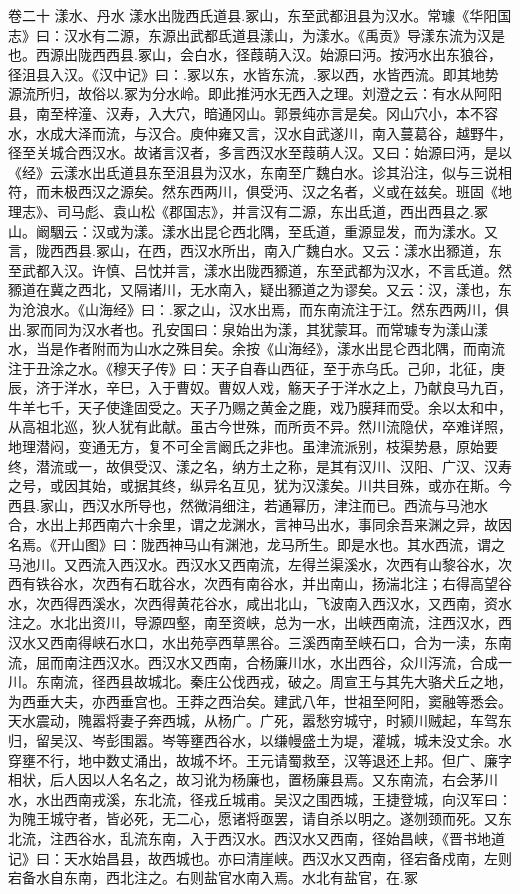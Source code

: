 \documentclass[12pt,UTF8]{ctexbook}
\begin{document}
卷二十  漾水、丹水 
漾水出陇西氏道县.冢山，东至武都沮县为汉水。常璩《华阳国志》曰：汉水有二源，东源出武都氐道县漾山，为漾水。《禹贡》导漾东流为汉是也。西源出陇西西县.冢山，会白水，径葭萌入汉。始源曰沔。按沔水出东狼谷，径沮县入汉。《汉中记》曰：.冢以东，水皆东流，.冢以西，水皆西流。即其地势源流所归，故俗以.冢为分水岭。即此推沔水无西入之理。刘澄之云：有水从阿阳县，南至梓潼、汉寿，入大穴，暗通冈山。郭景纯亦言是矣。冈山穴小，本不容水，水成大泽而流，与汉合。庾仲雍又言，汉水自武遂川，南入蔓葛谷，越野牛，径至关城合西汉水。故诸言汉者，多言西汉水至葭萌人汉。又曰：始源曰沔，是以《经》云漾水出氐道县东至沮县为汉水，东南至广魏白水。诊其沿注，似与三说相符，而未极西汉之源矣。然东西两川，俱受沔、汉之名者，义或在兹矣。班固《地理志》、司马彪、袁山松《郡国志》，并言汉有二源，东出氐道，西出西县之.冢山。阚駰云：汉或为漾。漾水出昆仑西北隅，至氐道，重源显发，而为漾水。又言，陇西西县.冢山，在西，西汉水所出，南入广魏白水。又云：漾水出豲道，东至武都入汉。许慎、吕忱并言，漾水出陇西豲道，东至武都为汉水，不言氐道。然豲道在冀之西北，又隔诸川，无水南入，疑出豲道之为谬矣。又云：汉，漾也，东为沧浪水。《山海经》曰：.冢之山，汉水出焉，而东南流注于江。然东西两川，俱出.冢而同为汉水者也。孔安国曰：泉始出为漾，其犹蒙耳。而常璩专为漾山漾水，当是作者附而为山水之殊目矣。余按《山海经》，漾水出昆仑西北隅，而南流注于丑涂之水。《穆天子传》曰：天子自春山西征，至于赤乌氏。己卯，北征，庚辰，济于洋水，辛巳，入于曹奴。曹奴人戏，觞天子于洋水之上，乃献良马九百，牛羊七千，天子使逢固受之。天子乃赐之黄金之鹿，戏乃膜拜而受。余以太和中，从高祖北巡，狄人犹有此献。虽古今世殊，而所贡不异。然川流隐伏，卒难详照，地理潜闷，变通无方，复不可全言阚氏之非也。虽津流派别，枝渠势悬，原始要终，潜流或一，故俱受汉、漾之名，纳方土之称，是其有汉川、汉阳、广汉、汉寿之号，或因其始，或据其终，纵异名互见，犹为汉漾矣。川共目殊，或亦在斯。今西县.家山，西汉水所导也，然微涓细注，若通幂历，津注而已。西流与马池水合，水出上邦西南六十余里，谓之龙渊水，言神马出水，事同余吾来渊之异，故因名焉。《开山图》曰：陇西神马山有渊池，龙马所生。即是水也。其水西流，谓之马池川。又西流入西汉水。西汉水又西南流，左得兰渠溪水，次西有山黎谷水，次西有铁谷水，次西有石耽谷水，次西有南谷水，并出南山，扬湍北注；右得高望谷水，次西得西溪水，次西得黄花谷水，咸出北山，飞波南入西汉水，又西南，资水注之。水北出资川，导源四壑，南至资峡，总为一水，出峡西南流，注西汉水，西汉水又西南得峡石水口，水出苑亭西草黑谷。三溪西南至峡石口，合为一渎，东南流，屈而南注西汉水。西汉水又西南，合杨廉川水，水出西谷，众川泻流，合成一川。东南流，径西县故城北。秦庄公伐西戎，破之。周宣王与其先大骆犬丘之地，为西垂大夫，亦西垂宫也。王莽之西治矣。建武八年，世祖至阿阳，窦融等悉会。天水震动，隗嚣将妻子奔西城，从杨广。广死，嚣愁穷城守，时颍川贼起，车驾东归，留吴汉、岑彭围嚣。岑等壅西谷水，以缣幔盛土为堤，灌城，城未没丈余。水穿壅不行，地中数丈涌出，故城不坏。王元请蜀救至，汉等退还上邦。但广、廉字相状，后人因以人名名之，故习讹为杨廉也，置杨廉县焉。又东南流，右会茅川水，水出西南戎溪，东北流，径戎丘城甫。吴汉之围西城，王捷登城，向汉军曰：为隗王城守者，皆必死，无二心，愿诸将亟罢，请自杀以明之。遂刎颈而死。又东北流，注西谷水，乱流东南，入于西汉水。西汉水又西南，径始昌峡，《晋书地道记》曰：天水始昌县，故西城也。亦曰清崖峡。西汉水又西南，径宕备戍南，左则宕备水自东南，西北注之。右则盐官水南入焉。水北有盐官，在.冢
\end{document}
